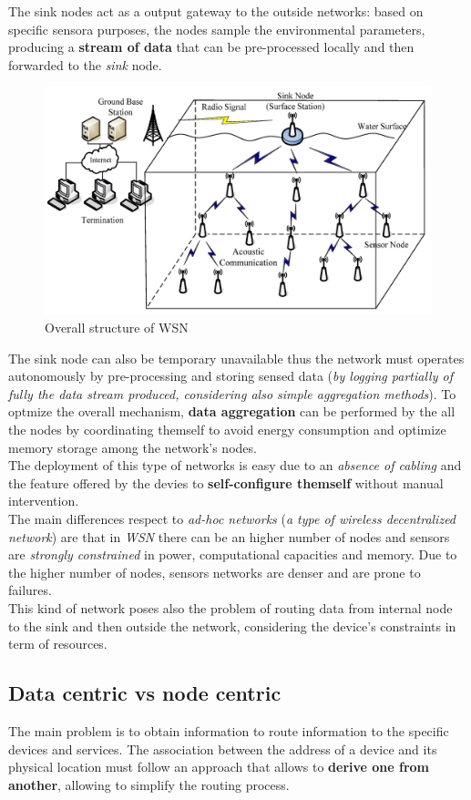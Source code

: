 \documentclass[10pt,a4paper]{report}
\theoremstyle{definition}
\begin{document}
The sink nodes act as a output gateway to the outside networks: based on specific sensora purposes, the nodes sample the environmental parameters, producing a \textbf{stream of data} that can be pre-processed locally and then forwarded to the \textit{sink} node.
\begin{figure}[h]
	\centering\includegraphics[scale=0.13]{images/Pasted image 20230522162020.png}
	\caption{Overall structure of WSN}
\end{figure}

The sink node can also be temporary unavailable thus the network must operates autonomously by pre-processing and storing sensed data (\textit{by logging partially of fully the data stream produced, considering also simple aggregation methods}).
To optmize the overall mechanism, \textbf{data aggregation} can be performed by the all the nodes by coordinating themself to avoid energy consumption and optimize memory storage among the network's nodes.\\
The deployment of this type of networks is easy due to an \textit{absence of cabling} and the feature offered by the devies to \textbf{self-configure themself} without manual intervention.\\
The main differences respect to \textit{ad-hoc networks} (\textit{a type of wireless decentralized network}) are that in \textit{WSN} there can be an higher number of nodes and sensors are \textit{strongly constrained} in power, computational capacities and memory.  Due to the higher number of nodes, sensors networks are denser and are prone to failures.\\
This kind of network poses also the problem of routing data from internal node to the sink and then outside the network, considering the device's constraints in term of resources.
\subsection{Data centric vs node centric}\label{sec:data-centric-vs-node-centric}
The main problem is to obtain information to route information to the specific devices and services.
The association between the address of a device and its physical location must follow an approach that allows to \textbf{derive one from another}, allowing to simplify the routing process.
\end{document}

